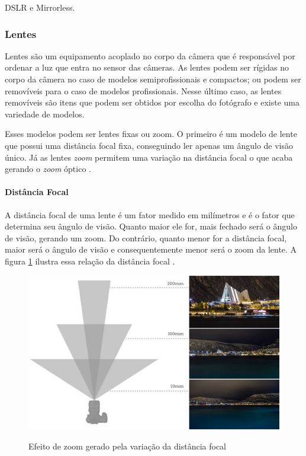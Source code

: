 DSLR e Mirrorless. \cite{man:vanessacameras}

\subsubsection{Lentes}

Lentes são um equipamento acoplado no corpo da câmera que é responsável por ordenar a luz que entra no sensor das câmeras. As lentes podem ser rígidas no corpo da câmera no caso de modelos semiprofissionais e compactos; ou podem ser removíveis para o caso de modelos profissionais. Nesse último caso, as lentes removíveis são itens que podem ser obtidos por escolha do fotógrafo e existe uma variedade de modelos.

Esses modelos podem ser lentes fixas ou zoom. O primeiro é um modelo de lente que possui uma distância focal fixa, conseguindo ler apenas um ângulo de visão único. Já as lentes \textit{zoom} permitem uma variação na distância focal o que acaba gerando o \textit{zoom} óptico \cite{man:claudia7licoes}. 

\paragraph{Distância Focal}

A distância focal de uma lente é um fator medido em milímetros e é o fator que determina seu ângulo de visão. Quanto maior ele for, mais fechado será o ângulo de visão, gerando um zoom. Do contrário, quanto menor for a distância focal, maior será o ângulo de visão e consequentemente menor será o zoom da lente. A figura \ref{fig:focaldistance} ilustra essa relação da distância focal \cite{man:claudia7licoes}.

\begin{figure}[htb]
	\centering
	\caption{Efeito de zoom gerado pela variação da distância focal}
	\includegraphics[width=0.7\linewidth]{figuras/claudia-distanciafocal}
	\label{fig:focaldistance}
\end{figure}

